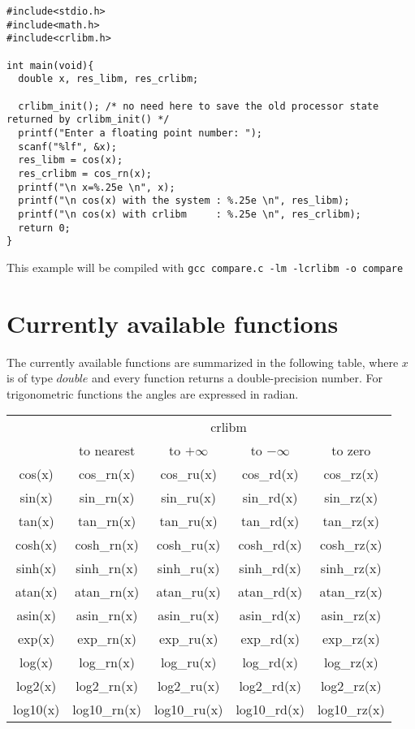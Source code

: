 \begin{lstlisting}[label={chap0:lst:prog_example},caption={compare.c},firstnumber=1]
#include<stdio.h>
#include<math.h>
#include<crlibm.h>

int main(void){
  double x, res_libm, res_crlibm;

  crlibm_init(); /* no need here to save the old processor state returned by crlibm_init() */ 
  printf("Enter a floating point number: ");
  scanf("%lf", &x);
  res_libm = cos(x);
  res_crlibm = cos_rn(x);
  printf("\n x=%.25e \n", x);
  printf("\n cos(x) with the system : %.25e \n", res_libm);
  printf("\n cos(x) with crlibm     : %.25e \n", res_crlibm);
  return 0;
}
\end{lstlisting}

This example will be compiled with \texttt{gcc compare.c -lm -lcrlibm -o compare}


\section{Currently available functions}

The currently available functions are summarized in the following
table, where $x$ is of type $double$ and every function returns a
double-precision number. For trigonometric functions the angles are
expressed in radian.
\begin{center}
\begin{tabular}{|c|c|c|c|c|}    \hline
 & \multicolumn{4}{c|}{crlibm} \\ \cline{2-5}
 \raisebox{5pt}{C99} & to nearest & to $+ \infty$ & to $- \infty$ & to zero \\ \hline
    cos(x) & cos\_rn(x) & cos\_ru(x) & cos\_rd(x) & cos\_rz(x) \\ \hline
    sin(x) & sin\_rn(x) & sin\_ru(x) & sin\_rd(x) & sin\_rz(x) \\ \hline
    tan(x) & tan\_rn(x) & tan\_ru(x) & tan\_rd(x) & tan\_rz(x) \\ \hline
    cosh(x) & cosh\_rn(x) & cosh\_ru(x) & cosh\_rd(x) & cosh\_rz(x) \\ \hline
    sinh(x) & sinh\_rn(x) & sinh\_ru(x) & sinh\_rd(x) & sinh\_rz(x) \\ \hline
    atan(x) & atan\_rn(x) & atan\_ru(x) & atan\_rd(x) & atan\_rz(x) \\ \hline
    asin(x) & asin\_rn(x) & asin\_ru(x) & asin\_rd(x) & asin\_rz(x) \\ \hline
    exp(x) & exp\_rn(x) & exp\_ru(x) & exp\_rd(x) & exp\_rz(x) \\ \hline
    log(x) & log\_rn(x) & log\_ru(x) & log\_rd(x) & log\_rz(x) \\ \hline
    log2(x) & log2\_rn(x) & log2\_ru(x) & log2\_rd(x) & log2\_rz(x) \\ \hline
    log10(x) & log10\_rn(x) & log10\_ru(x) & log10\_rd(x) & log10\_rz(x) \\ \hline
\end{tabular}
\end{center}



